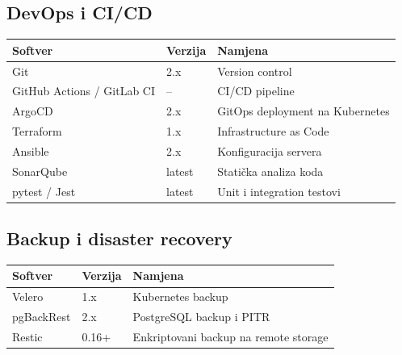 \documentclass{article}
\begin{document}
\subsection{DevOps i CI/CD}

\begin{center}
\begin{tabular}{|l|l|l|}
\hline
\rowcolor{lightgray}
\textbf{Softver} & \textbf{Verzija} & \textbf{Namjena} \\
\hline
Git & 2.x & Version control \\
\hline
GitHub Actions / GitLab CI & -- & CI/CD pipeline \\
\hline
ArgoCD & 2.x & GitOps deployment na Kubernetes \\
\hline
Terraform & 1.x & Infrastructure as Code \\
\hline
Ansible & 2.x & Konfiguracija servera \\
\hline
SonarQube & latest & Statička analiza koda \\
\hline
pytest / Jest & latest & Unit i integration testovi \\
\hline
\end{tabular}
\end{center}

\subsection{Backup i disaster recovery}

\begin{center}
\begin{tabular}{|l|l|l|}
\hline
\rowcolor{lightgray}
\textbf{Softver} & \textbf{Verzija} & \textbf{Namjena} \\
\hline
Velero & 1.x & Kubernetes backup \\
\hline
pgBackRest & 2.x & PostgreSQL backup i PITR \\
\hline
Restic & 0.16+ & Enkriptovani backup na remote storage \\
\hline
\end{tabular}
\end{center}
\end{document}
